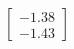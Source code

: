 \documentclass[preview]{standalone}
\begin{document}
\begin{align*}
\begin{bmatrix} -1.38 \\ -1.43 \end{bmatrix}
\end{align*}
\end{document}
